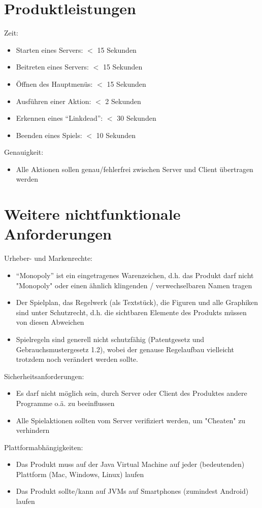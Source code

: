 \documentclass[a4paper,10pt]{article}
\begin{document}
\section{Produktleistungen}
Zeit:
\begin{itemize}
\item Starten eines Servers: $<$ 15 Sekunden
\item Beitreten eines Servers: $<$ 15 Sekunden
\item Öffnen des Hauptmenüs: $<$ 15 Sekunden
\item Ausführen einer Aktion: $<$ 2 Sekunden
\item Erkennen eines ``Linkdead'': $<$ 30 Sekunden
\item Beenden eines Spiels: $<$ 10 Sekunden
\end{itemize}
Genauigkeit:
\begin{itemize}
\item Alle Aktionen sollen genau/fehlerfrei zwischen Server und Client übertragen werden
\end{itemize}
\section{Weitere nichtfunktionale Anforderungen}
Urheber- und Markenrechte:
\begin{itemize}
\item ``Monopoly'' ist ein eingetragenes Warenzeichen, d.h. das Produkt darf nicht "Monopoly" oder einen ähnlich klingenden / verwechselbaren Namen tragen
\item Der Spielplan, das Regelwerk (als Textstück), die Figuren und alle Graphiken sind unter Schutzrecht, d.h. die sichtbaren Elemente des Produkts müssen von diesen Abweichen
\item Spielregeln sind generell nicht schutzfähig (Patentgesetz und Gebrauchsmustergesetz 1.2), wobei der genause Regelaufbau vielleicht trotzdem noch verändert werden sollte.
\end{itemize}
Sicherheitsanforderungen:
\begin{itemize}
\item Es darf nicht möglich sein, durch Server oder Client des Produktes andere Programme o.ä. zu beeinflussen
\item Alle Spielaktionen sollten vom Server verifiziert werden, um "Cheaten" zu verhindern
\end{itemize}
Plattformabhängigkeiten:
\begin{itemize}
\item Das Produkt muss auf der Java Virtual Machine auf jeder (bedeutenden) Plattform (Mac, Windows, Linux) laufen
\item Das Produkt sollte/kann auf JVMs auf Smartphones (zumindest Android) laufen
\end{itemize}
\end{document}
